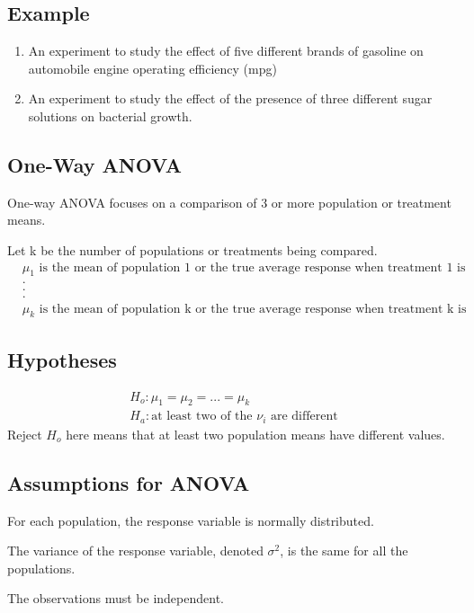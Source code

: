 \documentclass{article}
\begin{document}
            \subsection*{Example}
            \begin{enumerate}
                \item An experiment to study the effect of five different brands of gasoline 
                        on automobile engine operating efficiency (mpg)
                \item An experiment to study the effect of the presence of three 
                        different sugar solutions on bacterial growth.
            \end{enumerate}

            \subsection*{One-Way ANOVA}
            One-way ANOVA focuses on a comparison of 3 or more population or 
            treatment means.\par

            Let k be the number of populations or treatments being compared.
            \begin{align*}
                &\mu_{1} \text{ is the mean of population 1 or the true average response when 
                treatment 1 is applied.}\\
                &\text{.}\\
                &\text{.}\\
                &\text{.}\\
                &\mu_{k} \text{ is the mean of population k or the true average 
                response when treatment k is applied.}
            \end{align*}

            \subsection*{Hypotheses}
            \begin{align*}
                H_{o}: \mu_{1} = \mu_{2} = ...= \mu_{k}\\
                H_{a}: \text{at least two of the $\nu_{i}$ are different}
            \end{align*}
            Reject $H_{o}$ here means that at least two population means have 
            different values.

            \subsection*{Assumptions for ANOVA}
            For each population, the response variable is normally distributed.\par
            The variance of the response variable, denoted $\sigma^{2}$, is the same for all the 
            populations.\par
            The observations must be independent.
            
\end{document}
